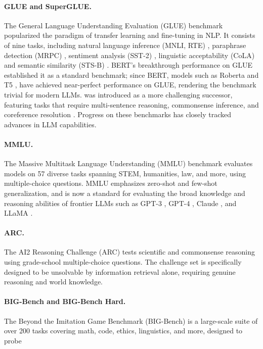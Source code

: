 \paragraph{GLUE and SuperGLUE.} The General Language Understanding Evaluation (GLUE) benchmark \citep{wang2018glue} popularized the paradigm of transfer learning and fine-tuning in NLP. It consists of nine tasks, including natural language inference (MNLI, RTE) \citep{williams2018mnli,dagan2006rte}, paraphrase detection (MRPC) \citep{dolan2005mrpc}, sentiment analysis (SST-2) \citep{socher2013sst}, linguistic acceptability (CoLA) \citep{warstadt2019cola} and semantic similarity (STS-B) \citep{cer2017stsb}. BERT's breakthrough performance on GLUE established it as a standard benchmark; since BERT, models such as Roberta \citep{liu2019roberta} and T5 \citep{raffel2020t5}, have achieved near-perfect performance on GLUE, rendering the benchmark trivial for modern LLMs.  \citep{wang2019superglue} was introduced as a more challenging successor, featuring tasks that require multi-sentence reasoning, commonsense inference, and coreference resolution \citep{zhang2018record,pilehvar2019wic,khashabi2018multirc,roemmele2011copa}. Progress on these benchmarks has closely tracked advances in LLM capabilities.

\paragraph{MMLU.} The Massive Multitask Language Understanding (MMLU) \citep{hendrycks2021mmlu} benchmark evaluates models on 57 diverse tasks spanning STEM, humanities, law, and more, using multiple-choice questions. MMLU emphasizes zero-shot and few-shot generalization, and is now a standard for evaluating the broad knowledge and reasoning abilities of frontier LLMs such as GPT-3 \citep{brown2020gpt3}, GPT-4 \citep{openai2023gpt4}, Claude \citep{anthropic2024claude3}, and LLaMA \citep{touvron2023llama}.

\paragraph{ARC.} The AI2 Reasoning Challenge (ARC) \citep{clark2018arc} tests scientific and commonsense reasoning using grade-school multiple-choice questions. The challenge set is specifically designed to be unsolvable by information retrieval alone, requiring genuine reasoning and world knowledge.

\paragraph{BIG-Bench and BIG-Bench Hard.} The Beyond the Imitation Game Benchmark (BIG-Bench) \citep{suzgun2023bigbenchhard} is a large-scale suite of over 200 tasks covering math, code, ethics, linguistics, and more, designed to probe


